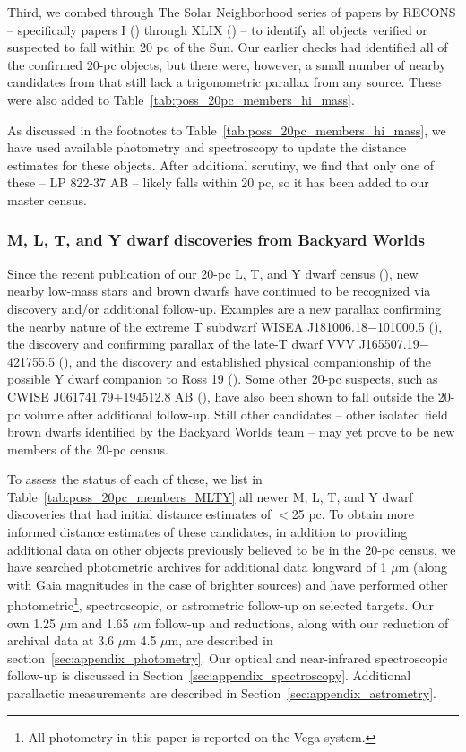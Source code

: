 \documentclass[twocolumn,tighten,twocolappendix]{aastex631}
\begin{document}
Third, we combed through The Solar Neighborhood series of papers by RECONS -- specifically papers I (\citealt{henry1994}) through XLIX (\citealt{vrijmoet2022}) -- to identify all objects verified or suspected to fall within 20 pc of the Sun. Our earlier checks had identified all of the confirmed 20-pc objects, but there were, however, a small number of nearby candidates from \cite{winters2015} that still lack a trigonometric parallax from any source. These were also added to Table~\ref{tab:poss_20pc_members_hi_mass}. 

As discussed in the footnotes to Table~\ref{tab:poss_20pc_members_hi_mass}, we have used available photometry and spectroscopy to update the distance estimates for these objects. After additional scrutiny, we find that only one  of these -- LP 822-37 AB -- likely falls within 20 pc, so it has been added to our master census.

\subsubsection{M, L, T, and Y dwarf discoveries from Backyard Worlds\label{sec:BYW_discoveries}}

Since the recent publication of our 20-pc L, T, and Y dwarf census (\citealt{kirkpatrick2021}), new nearby low-mass stars and brown dwarfs have continued to be recognized via discovery and/or additional follow-up. Examples are a new parallax confirming the nearby nature of the extreme T subdwarf WISEA J181006.18$-$101000.5 (\citealt{lodieu2022}), the discovery and confirming parallax of the late-T dwarf VVV J165507.19$-$421755.5 (\citealt{schapera2022}), and the discovery and established physical companionship of the possible Y dwarf companion to Ross 19 (\citealt{schneider2021}). Some other 20-pc suspects, such as CWISE J061741.79+194512.8 AB (\citealt{humphreys2023}), have also been shown to fall outside the 20-pc volume after additional follow-up. Still other candidates -- other isolated field brown dwarfs identified by the Backyard Worlds team -- may yet prove to be new members of the 20-pc census.

To assess the status of each of these, we list in Table~\ref{tab:poss_20pc_members_MLTY} all newer M, L, T, and Y dwarf discoveries that had initial distance estimates of $<$25 pc. To obtain more informed distance estimates of these candidates, in addition to providing additional data on other objects previously believed to be in the 20-pc census, we have searched photometric archives for additional data longward of 1 $\mu$m (along with Gaia magnitudes in the case of brighter sources) and have performed other photometric\footnote{All photometry in this paper is reported on the Vega system.}, spectroscopic, or astrometric follow-up on selected targets. Our own 1.25 $\mu$m and 1.65 $\mu$m follow-up and reductions, along with our reduction of archival data at 3.6 $\mu$m 4.5 $\mu$m, are described in section~\ref{sec:appendix_photometry}. Our optical and near-infrared spectroscopic follow-up is discussed in Section~\ref{sec:appendix_spectroscopy}. Additional parallactic measurements are described in Section~\ref{sec:appendix_astrometry}.
\end{document}
